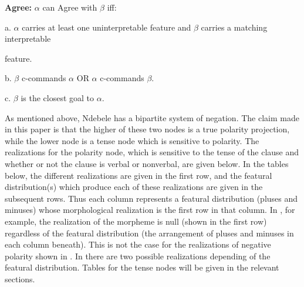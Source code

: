 \documentclass[output=paper]{langsci/langscibook}
\begin{document}
\begin{exe}
\ex \textbf{Agree:} $\alpha$ can Agree with $\beta$ iff:


a. $\alpha$ carries at least one uninterpretable feature and $\beta$ carries a matching interpretable 

feature.


b. $\beta$ c-commands $\alpha$ OR $\alpha$ c-commands $\beta$.


c. $\beta$ is the closest goal to $\alpha$.
\end{exe}

As mentioned above, Ndebele has a bipartite system of negation. The claim made in this paper is that the higher of these two nodes is a true polarity projection, while the lower node is a tense node which is sensitive to polarity. The realizations for the polarity node, which is sensitive to the tense of the clause and whether or not the clause is verbal or nonverbal, are given below. In the tables below, the different realizations are given in the first row, and the featural distribution(s) which produce each of these realizations are given in the subsequent rows. Thus each column represents a featural distribution (pluses and minuses) whose morphological realization is the first row in that column. In , for example, the realization of the morpheme is null (shown in the first row) regardless of the featural distribution (the arrangement of pluses and minuses in each column beneath). This is not the case for the realizations of negative polarity shown in . In  there are two possible realizations depending of the featural distribution. Tables for the tense nodes will be given in the relevant sections.

\end{document}
